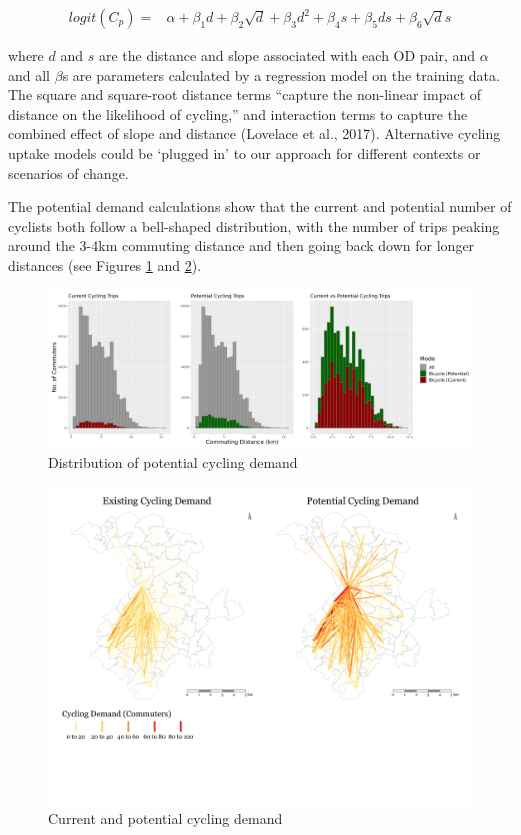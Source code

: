 \documentclass[
]{article}
\begin{document}
\begin{align}\label{eq:pcteqn}
     logit(C_{p}) = & \alpha + \beta_1 d + \beta_2 \sqrt{d} + \beta_3 d^2 + \beta_4 s + \beta_5 ds + \beta_6 \sqrt{d}s 
\end{align}

\noindent where \(d\) and \(s\) are the distance and slope associated with each
OD pair, and \(\alpha\) and all \(\beta\)s are parameters calculated by a regression
model on the training data. The square and square-root distance terms
``capture the non-linear impact of distance on the likelihood of
cycling,'' and interaction terms to capture the combined effect of slope
and distance (Lovelace et al., 2017). Alternative cycling uptake
models could be `plugged in' to our approach for different contexts or scenarios of change.

The potential demand calculations show that the current and potential
number of cyclists both follow a bell-shaped distribution, with the
number of trips peaking around the 3-4km commuting distance and then
going back down for longer distances (see Figures
\ref{fig:potdemhistograms} and \ref{fig:desirefacetcycling}).

\begin{figure}

{\centering \includegraphics[width=1\linewidth]{data/Manchester/Plots/histogram_distance_cycling_potential_current_all} 

}

\caption{Distribution of potential cycling demand}\label{fig:potdemhistograms}
\end{figure}

\begin{figure}[H]

{\centering \includegraphics[width=0.65\linewidth]{data/Manchester/Plots/desire_facet_cycling} 

}

\caption{Current and potential cycling demand}\label{fig:desirefacetcycling}
\end{figure}
\end{document}
